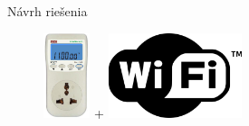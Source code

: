 \documentclass[hyperref={unicode}]{beamer}
\begin{document}
\def \myGraphicsHeight {2.5cm}
\begin{frame}{Návrh riešenia}
	\begin{figure}[htp]
		\centering
		\includegraphics[align=c,height=\myGraphicsHeight]{digital-plug-meter}
		{\Huge +}
		\includegraphics[align=c,height=\myGraphicsHeight]{logo-wifi}

\end{figure}
\end{frame}
\end{document}

